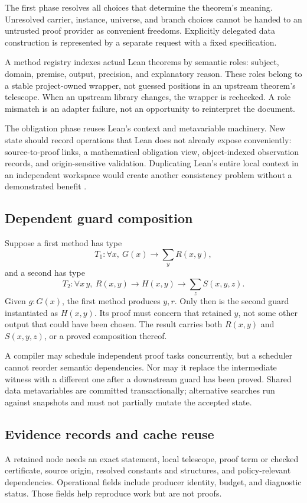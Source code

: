 \documentclass[11pt,a4paper]{article}
\theoremstyle{plain}\newtheorem{proposition}{Proposition}[section]
\theoremstyle{definition}\newtheorem{definition}[proposition]{Definition}
\theoremstyle{remark}\newtheorem{remark}[proposition]{Remark}
\begin{document}
The first phase resolves all choices that determine the theorem's meaning. Unresolved carrier, instance, universe, and branch choices cannot be handed to an untrusted proof provider as convenient freedoms. Explicitly delegated data construction is represented by a separate request with a fixed specification.

A method registry indexes actual Lean theorems by semantic roles: subject, domain, premise, output, precision, and explanatory reason. These roles belong to a stable project-owned wrapper, not guessed positions in an upstream theorem's telescope. When an upstream library changes, the wrapper is rechecked. A role mismatch is an adapter failure, not an opportunity to reinterpret the document.

The obligation phase reuses Lean's context and metavariable machinery. New state should record operations that Lean does not already expose conveniently: source-to-proof links, a mathematical obligation view, object-indexed observation records, and origin-sensitive validation. Duplicating Lean's entire local context in an independent workspace would create another consistency problem without a demonstrated benefit \cite{synA,synB}.

\subsection{Dependent guard composition}
Suppose a first method has type
\[
 T_1:\forall x,\ G(x)\to\sum_y R(x,y),
\]
and a second has type
\[
 T_2:\forall x\,y,\ R(x,y)\to H(x,y)\to\sum_z S(x,y,z).
\]
Given \(g:G(x)\), the first method produces \(y,r\). Only then is the second guard instantiated as \(H(x,y)\). Its proof must concern that retained \(y\), not some other output that could have been chosen. The result carries both \(R(x,y)\) and \(S(x,y,z)\), or a proved composition thereof.

A compiler may schedule independent proof tasks concurrently, but a scheduler cannot reorder semantic dependencies. Nor may it replace the intermediate witness with a different one after a downstream guard has been proved. Shared data metavariables are committed transactionally; alternative searches run against snapshots and must not partially mutate the accepted state.

\subsection{Evidence records and cache reuse}
A retained node needs an exact statement, local telescope, proof term or checked certificate, source origin, resolved constants and structures, and policy-relevant dependencies. Operational fields include producer identity, budget, and diagnostic status. Those fields help reproduce work but are not proofs.
\end{document}
